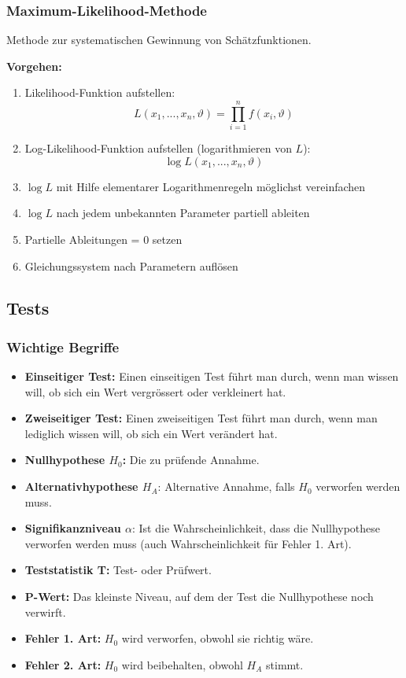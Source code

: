 \documentclass[10pt,a4paper,twocolumn]{article}
\begin{document}
\subsubsection{Maximum-Likelihood-Methode}
Methode zur systematischen Gewinnung von Schätzfunktionen.

\vspace{10pt}

\textbf{Vorgehen:}
\begin{enumerate}
\item Likelihood-Funktion aufstellen:
\[
L(x_1,...,x_n,\vartheta)= \prod \limits_{i=1}^{n} f(x_i,\vartheta)
\]
\item Log-Likelihood-Funktion aufstellen (logarithmieren von $L$):
\[
\log L(x_1,...,x_n,\vartheta)
\]
\item $\log L$ mit Hilfe elementarer Logarithmenregeln möglichst vereinfachen
\item $\log L$ nach jedem unbekannten Parameter partiell ableiten
\item Partielle Ableitungen = 0 setzen
\item Gleichungssystem nach Parametern auflösen
\end{enumerate}

\subsection{Tests}

\subsubsection{Wichtige Begriffe}

\begin{itemize}
\item \textbf{Einseitiger Test:} Einen einseitigen Test führt man durch, wenn man wissen will, ob sich ein Wert vergrössert oder verkleinert hat.
\item \textbf{Zweiseitiger Test:} Einen zweiseitigen Test führt man durch, wenn man lediglich wissen will, ob sich ein Wert verändert hat.
\item \textbf{Nullhypothese $H_0$:} Die zu prüfende Annahme.
\item \textbf{Alternativhypothese $H_A$}: Alternative Annahme, falls $H_0$ verworfen werden muss.
\item \textbf{Signifikanzniveau $\alpha$}: Ist die Wahrscheinlichkeit, dass die Nullhypothese verworfen werden muss (auch Wahrscheinlichkeit für Fehler 1. Art).
\item \textbf{Teststatistik T:} Test- oder Prüfwert.
\item \textbf{P-Wert:} Das kleinste Niveau, auf dem der Test die Nullhypothese noch verwirft.
\item \textbf{Fehler 1. Art:} $H_0$ wird verworfen, obwohl sie richtig wäre.
\item \textbf{Fehler 2. Art:} $H_0$ wird beibehalten, obwohl $H_A$ stimmt.
\end{itemize}
\end{document}
